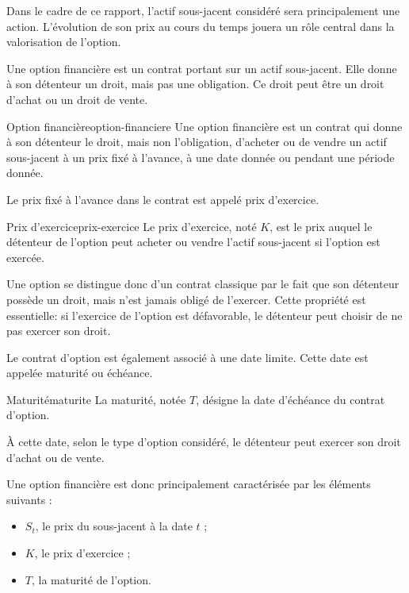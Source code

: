 \documentclass[11pt]{report}
\begin{document}
Dans le cadre de ce rapport, l'actif sous-jacent considéré sera principalement une action. L'évolution de son prix au cours du temps jouera un rôle central dans la valorisation de l'option.

Une option financière est un contrat portant sur un actif sous-jacent. Elle donne à son détenteur un droit, mais pas une obligation. Ce droit peut être un droit d'achat ou un droit de vente.

\begin{definition}{Option financière}{option-financiere}
Une option financière est un contrat qui donne à son détenteur le droit, mais non l'obligation, d'acheter ou de vendre un actif sous-jacent à un prix fixé à l'avance, à une date donnée ou pendant une période donnée.
\end{definition}

Le prix fixé à l'avance dans le contrat est appelé prix d'exercice.

\begin{definition}{Prix d'exercice}{prix-exercice}
Le prix d'exercice, noté $K$, est le prix auquel le détenteur de l'option peut acheter ou vendre l'actif sous-jacent si l'option est exercée.
\end{definition}

Une option se distingue donc d'un contrat classique par le fait que son détenteur possède un droit, mais n'est jamais obligé de l'exercer. Cette propriété est essentielle: si l'exercice de l'option est défavorable, le détenteur peut choisir de ne pas exercer son droit.

Le contrat d'option est également associé à une date limite. Cette date est appelée maturité ou échéance.

\begin{definition}{Maturité}{maturite}
La maturité, notée $T$, désigne la date d'échéance du contrat d'option.

À cette date, selon le type d'option considéré, le détenteur peut exercer son droit d'achat ou de vente.
\end{definition}

Une option financière est donc principalement caractérisée par les éléments suivants :
\begin{itemize}
   \item $S_t$, le prix du sous-jacent à la date $t$ ;
   \item $K$, le prix d'exercice ;
   \item $T$, la maturité de l'option.
\end{itemize}
\end{document}
